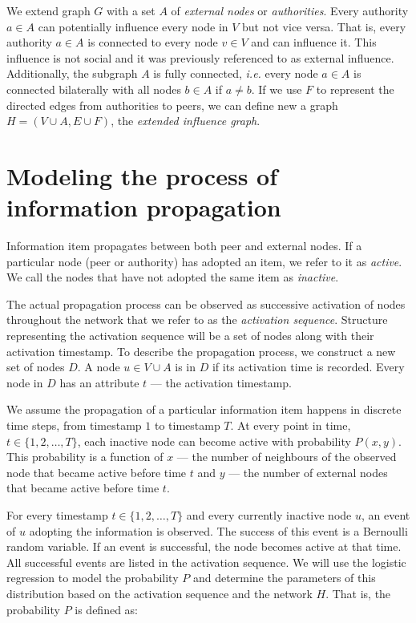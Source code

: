 \documentclass[times, utf8, zavrsni]{fer}
\begin{document}
We extend graph $G$ with a set $A$ of \emph{external nodes} or \emph{authorities}. Every authority $a \in A$ can potentially influence every node in $V$ but not vice versa.  That is, every authority $a \in A$ is connected to every node $v \in V$ and can influence it. This influence is not social and it was previously  referenced to as external influence. Additionally, the subgraph $A$ is fully connected, \emph{i.e.} every node $a \in A$ is connected bilaterally with all nodes $b \in A$ if $a \neq b$. If we use $F$ to represent the directed edges from authorities to peers, we can define new a graph $H = (V \cup A, E \cup F)$,  the \emph{extended influence graph}. 

\section{Modeling the process of information propagation}
 
 Information item propagates between both peer and external nodes. If a particular node (peer or authority) has adopted an item, we refer to it as \emph{active}. We call the nodes that  have not adopted the same item as \emph{inactive}. 
 
The actual propagation process can be observed as successive activation of nodes throughout the network that we refer to as the  \emph{activation sequence}. Structure representing the activation sequence will be a set of nodes along with their activation timestamp. To describe the propagation process, we construct a new set of nodes $D$. A node $u \in V \cup A$ is in $D$ if its activation time  is recorded. Every node in $D$ has an attribute $t$ --- the activation timestamp.    

We assume the propagation of a particular information item happens in discrete time steps, from timestamp $1$ to timestamp $T$. At every point in time, $t \in \{1, 2, \dots, T\}$, each inactive node can become active with probability $P(x, y)$. This probability is a function of $x$ --- the number of neighbours  of the observed node that became active before time $t$ and $y$ --- the number of external nodes that became active before time $t$.

For every timestamp $t \in \{1, 2, \dots, T\}$ and every currently inactive node $u$, an event of $u$ adopting the information is observed. The success of this event is a  Bernoulli random variable. If an event is successful, the node becomes active at that time. All successful events are listed in the activation sequence. We will use the logistic regression to model the probability $P$ and determine the parameters of this distribution based on the activation sequence and the network $H$. That is, the probability $P$ is defined as:
\end{document}
